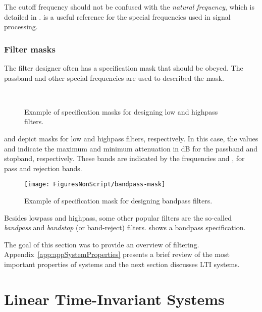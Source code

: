 The cutoff frequency should not be confused with the \emph{natural frequency}, which is detailed in .  is a useful reference for the special frequencies used in signal processing.

\subsubsection{Filter masks}

The filter designer often has a specification mask that should be obeyed. The passband and other special frequencies are used to described the mask.

\begin{figure}
\centering
{}\\
  \caption{Example of specification masks for designing low and highpass filters.\label{fig:masks}}
\end{figure}

 and   depict masks for low and highpass filters, respectively. In this case, the values  and  indicate the maximum and minimum attenuation in dB for the passband and stopband, respectively. These bands are indicated by the frequencies  and , for pass and rejection bands.

\begin{figure}
\centering
\texttt{[image: FiguresNonScript/bandpass-mask]}
\caption{Example of specification mask for designing bandpass filters.\label{fig:bandpass-mask}}
\end{figure}

Besides lowpass and highpass, some other popular filters are the so-called \emph{bandpass} and \emph{bandstop} (or band-reject) filters.  shows a bandpass specification. 

The goal of this section was to provide an overview of filtering. 
Appendix~\ref{app:appSystemProperties} presents
a brief review of the most important properties of systems and the next section discusses LTI systems.

\section{Linear Time-Invariant Systems}
\label{sec:lti}

